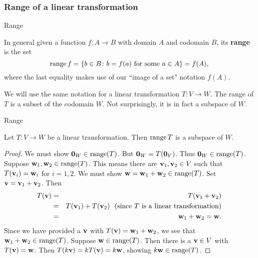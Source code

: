 \subsubsection*{Range of a linear transformation}
\begin{frame}{Range}
\begin{definition}
In general given a function $f\colon A\rightarrow B$ with domain $A$ and codomain $B$, its {\bf range} is the set 
\[
\operatorname{range} f=\{b\in B\colon b=f(a) \text{ for some $a\in A$}\}=f(A),
\]
where the last equality makes use of our ``image of a set" notation $f(A)$. 
\end{definition}
\pause
We will use the same notation for a linear transformation $T\colon V\rightarrow W$. The range of $T$ is a subset of the codomain $W$. Not surprisingly, it is in fact a \alert{subspace} of $W$. 
\end{frame}
\begin{frame}{Range}
\begin{theorem}
Let $T\colon V\rightarrow W$ be a linear transformation. Then $\operatorname{range} T$ is a subspace of $W$. 
\end{theorem}
\pause
\begin{proof}
\bb[(i)]
\pause\ii We must show ${\mathbf 0}_W\in \operatorname{range}(T)$. But ${\mathbf 0}_W=T({\mathbf 0}_V)$. Thus ${\mathbf 0}_W\in\operatorname{range}(T)$. 
\pause\ii Suppose ${\mathbf w}_1,{\mathbf w}_2\in \operatorname{range}(T)$. This means there are ${\mathbf v}_1, {\mathbf v}_2\in V$ such that $T({\mathbf v}_i)={\mathbf w}_i$ for $i=1,2$. We must show ${\mathbf w}={\mathbf w}_1+{\mathbf w}_2\in\operatorname{range}(T)$.  
\bpause 
Set ${\mathbf v}={\mathbf v}_1+{\mathbf v}_2$. Then
\begin{eqnarray*}
T({\mathbf v})&=&T({\mathbf v}_1+{\mathbf v}_2)\\
&=&T({\mathbf v}_1)+T({\mathbf v}_2) \ \text{ (since $T$ is a linear transformation)}\\
&=&{\mathbf w}_1+{\mathbf w}_2={\mathbf w}.
\end{eqnarray*} 
Since we have provided a ${\mathbf v}$ with $T({\mathbf v})={\mathbf w}_1+{\mathbf w}_2$, we see that ${\mathbf w}_1+{\mathbf w}_2\in\operatorname{range}(T)$. 
\pause\ii Suppose ${\mathbf w}\in\operatorname{range}(T)$. Then there is a ${\mathbf v}\in V$ with $T({\mathbf v})={\mathbf w}$. Then $T(k{\mathbf v})=kT({\mathbf v})=k{\mathbf w}$, showing $k{\mathbf w}\in\operatorname{range}(T)$.  
\ee

\end{proof}
 
\end{frame}
